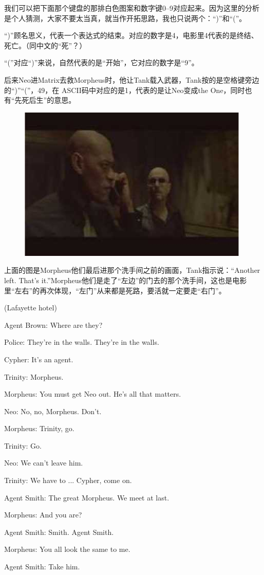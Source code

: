 \documentclass{ctexart}
\newenvironment{myquote}{\color{green} \setlength{\leftskip}{6em} \setlength{\rightskip}{4em} \setlength{\parindent}{-2em}}{\par}
\begin{document}
我们可以把下面那个键盘的那排白色图案和数字键0--9对应起来。因为这里的分析是个人猜测，大家不要太当真，就当作开拓思路，我也只说两个：“)”和“(”。

“)”顾名思义，代表一个表达式的结束。对应的数字是4，电影里4代表的是终结、死亡。（同中文的“死”？）

“(”对应“)”来说，自然代表的是“开始”，它对应的数字是“9”。

后来Neo进Matrix去救Morpheus时，他让Tank载入武器，Tank按的是空格键旁边的“)”“(”，49，在 ASCII码中对应的是1，代表的是让Neo变成the One，同时也有“先死后生”的意思。

\begin{figure}[htb]
\centering
\includegraphics[width=0.5\linewidth]{fig/read_Matrix-56}
\end{figure}

上面的图是Morpheus他们最后进那个洗手间之前的画面，Tank指示说：“Another left. That's it.”Morpheus他们是走了“左边”的门去的那个洗手间，这也是电影里“左右”的再次体现，“左门”从来都是死路，要活就一定要走“右门”。

\begin{myquote}
(Lafayette hotel)

Agent Brown: Where are they?

Police: They're in the walls. They're in the walls.

Cypher: It's an agent.

Trinity: Morpheus.

Morpheus: You must get Neo out. He's all that matters.

Neo: No, no, Morpheus. Don't.

Morpheus: Trinity, go.

Trinity: Go.

Neo: We can't leave him.

Trinity: We have to ... Cypher, come on.

Agent Smith: The great Morpheus. We meet at last.

Morpheus: And you are?

Agent Smith: Smith. Agent Smith.

Morpheus: You all look the same to me.

Agent Smith: Take him.
\end{myquote}
\end{document}
